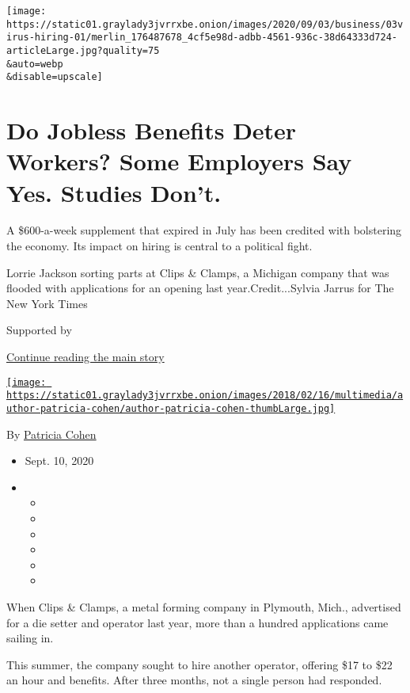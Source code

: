 \texttt{[image: https://static01.graylady3jvrrxbe.onion/images/2020/09/03/business/03virus-hiring-01/merlin\_176487678\_4cf5e98d-adbb-4561-936c-38d64333d724-articleLarge.jpg?quality=75\\\&auto=webp\\\&disable=upscale]}

\hypertarget{do-jobless-benefits-deter-workers-some-employers-say-yes-studies-dont}{%
\section{Do Jobless Benefits Deter Workers? Some Employers Say Yes.
Studies
Don't.}\label{do-jobless-benefits-deter-workers-some-employers-say-yes-studies-dont}}

A \$600-a-week supplement that expired in July has been credited with
bolstering the economy. Its impact on hiring is central to a political
fight.

Lorrie Jackson sorting parts at Clips \& Clamps, a Michigan company that
was flooded with applications for an opening last year.Credit...Sylvia
Jarrus for The New York Times

Supported by

\protect\hyperlink{after-sponsor}{Continue reading the main story}

\href{https://www.nytimes3xbfgragh.onion/by/patricia-cohen}{\texttt{[image: https://static01.graylady3jvrrxbe.onion/images/2018/02/16/multimedia/author-patricia-cohen/author-patricia-cohen-thumbLarge.jpg]}}

By \href{https://www.nytimes3xbfgragh.onion/by/patricia-cohen}{Patricia
Cohen}

\begin{itemize}
\item
  Sept. 10, 2020
\item
  \begin{itemize}
  \item
  \item
  \item
  \item
  \item
  \item
  \end{itemize}
\end{itemize}

When Clips \& Clamps, a metal forming company in Plymouth, Mich.,
advertised for a die setter and operator last year, more than a hundred
applications came sailing in.

This summer, the company sought to hire another operator, offering \$17
to \$22 an hour and benefits. After three months, not a single person
had responded.

